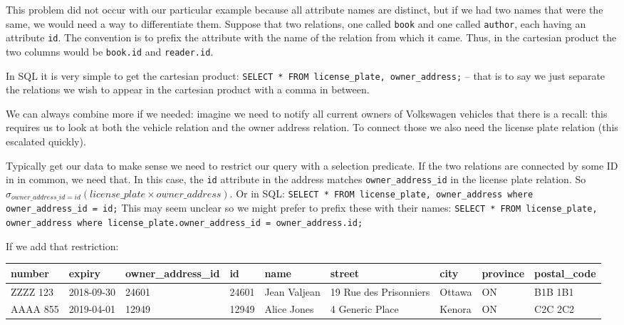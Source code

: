 \documentclass[a4paper]{report}
\begin{document}
This problem did not occur with our particular example because all attribute names are distinct, but if we had two names that were the same, we would need a way to differentiate them. Suppose that two relations, one called \texttt{book} and one called \texttt{author}, each having an attribute \texttt{id}. The convention is to prefix the attribute with the name of the relation from which it came. Thus, in the cartesian product the two columns would be \texttt{book.id} and \texttt{reader.id}.

In SQL it is very simple to get the cartesian product: \texttt{SELECT * FROM license\_plate, owner\_address;} -- that is to say we just separate the relations we wish to appear in the cartesian product with a comma in between.

We can always combine more if we needed: imagine we need to notify all current owners of Volkswagen vehicles that there is a recall: this requires us to look at both the vehicle relation and the owner address relation. To connect those we also need the license plate relation (this escalated quickly).

Typically get our data to make sense we need to restrict our query with a selection predicate. If the two relations are connected by some ID in in common, we need that. In this case, the \texttt{id} attribute in the address matches \texttt{owner\_address\_id} in the license plate relation. So $\sigma_{owner\_address\_id = id}( license\_plate \times owner\_address )$. Or in SQL: \texttt{SELECT * FROM license\_plate, owner\_address where owner\_address\_id = id;} This may seem unclear so we might prefer to prefix these with their names: \texttt{SELECT * FROM license\_plate, owner\_address where license\_plate.owner\_address\_id = owner\_address.id;} 

If we add that restriction:

{\scriptsize
\begin{center}
	\begin{tabular}{|l|l|l|l|l|l|l|l|l|}\hline
		\textbf{number} & \textbf{expiry} & \textbf{owner\_address\_id} & \textbf{id} & \textbf{name} &\textbf{street} & \textbf{city} & \textbf{province} & \textbf{postal\_code} \\ \hline
		ZZZZ 123 & 2018-09-30 & 24601 & 24601 & Jean Valjean & 19 Rue des Prisonniers & Ottawa & ON & B1B 1B1\\ \hline
		AAAA 855 & 2019-04-01 & 12949 & 12949 & Alice Jones & 4 Generic Place & Kenora & ON & C2C 2C2\\ \hline
	\end{tabular}
\end{center}
}
\end{document}
